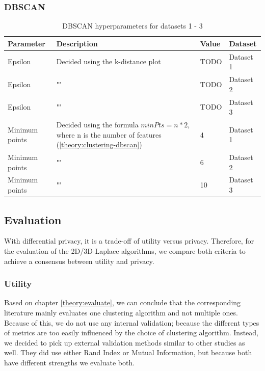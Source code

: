 \subsubsection{DBSCAN}
\begin{table}[h]
  \begin{tabular}{|l|p{6cm}|l|l|}
    \hline
    Parameter      & Description                                                                                                    & Value & Dataset   \\
    \hline
    Epsilon        & Decided using the k-distance plot                                                                              & TODO  & Dataset 1 \\
    \hline
    Epsilon        & ""                                                                                                             & TODO  & Dataset 2 \\
    \hline
    Epsilon        & ""                                                                                                             & TODO  & Dataset 3 \\
    \hline
    Minimum points & Decided using the formula $minPts = n * 2$, where n is the number of features (\ref{theory:clustering-dbscan}) & 4     & Dataset 1 \\
    \hline
    Minimum points & ""                                                                                                             & 6     & Dataset 2 \\
    \hline
    Minimum points & ""                                                                                                             & 10    & Dataset 3 \\
    \hline
  \end{tabular}
  \caption{DBSCAN  hyperparameters for datasets 1 - 3}
  \label{tab:dbscan-formula-sklearn}
\end{table}

\subsection{Evaluation}
With differential privacy, it is a trade-off of utility versus privacy.
Therefore, for the evaluation of the 2D/3D-Laplace algorithms, we compare both criteria to achieve a consensus between utility and privacy.
\subsubsection{Utility}
Based on chapter \ref{theory:evaluate}, we can conclude that the corresponding literature mainly evaluates one clustering algorithm and not multiple ones.
Because of this, we do not use any internal validation; because the different types of metrics are too easily influenced by the choice of clustering algorithm.
Instead, we decided to pick up external validation methods similar to other studies as well.
They did use either Rand Index or Mutual Information, but because both have different strengths we evaluate both.

